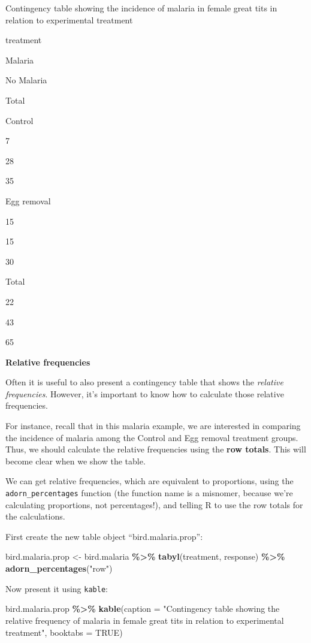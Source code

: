 \documentclass[
]{book}
\newenvironment{Shaded}{\begin{snugshade}}{\end{snugshade}}
\newcommand{\AttributeTok}[1]{\textcolor[rgb]{0.13,0.29,0.53}{#1}}
\newcommand{\ConstantTok}[1]{\textcolor[rgb]{0.56,0.35,0.01}{#1}}
\newcommand{\FunctionTok}[1]{\textcolor[rgb]{0.13,0.29,0.53}{\textbf{#1}}}
\newcommand{\NormalTok}[1]{#1}
\newcommand{\OtherTok}[1]{\textcolor[rgb]{0.56,0.35,0.01}{#1}}
\newcommand{\SpecialCharTok}[1]{\textcolor[rgb]{0.81,0.36,0.00}{\textbf{#1}}}
\newcommand{\StringTok}[1]{\textcolor[rgb]{0.31,0.60,0.02}{#1}}
\begin{document}
\label{tab:vismalaria}Contingency table showing the incidence of malaria in female great tits in relation to experimental treatment

treatment

Malaria

No Malaria

Total

Control

7

28

35

Egg removal

15

15

30

Total

22

43

65

\textbf{Relative frequencies}

Often it is useful to also present a contingency table that shows the \emph{relative frequencies}. However, it's important to know how to calculate those relative frequencies.

For instance, recall that in this malaria example, we are interested in comparing the incidence of malaria among the Control and Egg removal treatment groups. Thus, we should calculate the relative frequencies using the \textbf{row totals}. This will become clear when we show the table.

We can get relative frequencies, which are equivalent to proportions, using the \texttt{adorn\_percentages} function (the function name is a misnomer, because we're calculating proportions, not percentages!), and telling R to use the row totals for the calculations.

First create the new table object ``bird.malaria.prop'':

\begin{Shaded}
\begin{Highlighting}[]
\NormalTok{bird.malaria.prop }\OtherTok{\textless{}{-}}\NormalTok{ bird.malaria }\SpecialCharTok{\%\textgreater{}\%}
  \FunctionTok{tabyl}\NormalTok{(treatment, response) }\SpecialCharTok{\%\textgreater{}\%}
    \FunctionTok{adorn\_percentages}\NormalTok{(}\StringTok{"row"}\NormalTok{)}
\end{Highlighting}
\end{Shaded}

Now present it using \texttt{kable}:

\begin{Shaded}
\begin{Highlighting}[]
\NormalTok{bird.malaria.prop }\SpecialCharTok{\%\textgreater{}\%}
  \FunctionTok{kable}\NormalTok{(}\AttributeTok{caption =} \StringTok{"Contingency table showing the relative frequency of malaria in female great tits in relation to experimental treatment"}\NormalTok{, }\AttributeTok{booktabs =} \ConstantTok{TRUE}\NormalTok{)}
\end{Highlighting}
\end{Shaded}
\end{document}
